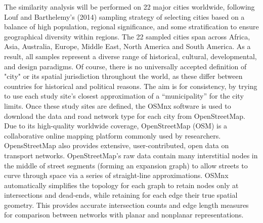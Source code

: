 The similarity analysis will be performed on 22 major cities worldwide, following Louf and Barthelemy's (2014) sampling strategy of selecting cities based on a balance of high population, regional significance, and some stratification to ensure geographical diversity within regions. The 22 sampled cities span across Africa, Asia, Australia, Europe, Middle East, North America and South America. As a result, all samples represent a diverse range of historical, cultural, developmental, and design paradigms. Of course, there is no universally accepted definition of "city" or its spatial jurisdiction throughout the world, as these differ between countries for historical and political reasons. The aim is for consistency, by trying to use each study site’s closest approximation of a “municipality” for the city limits. Once these study sites are defined, the OSMnx software is used to download the data and road network type for each city from OpenStreetMap. Due to its high-quality worldwide coverage, OpenStreetMap (OSM) is a collaborative online mapping platform commonly used by researchers. OpensStreetMap also provides extensive, user-contributed, open data on transport networks. OpenStreetMap’s raw data contain many interstitial nodes in the middle of street segments (forming an expansion graph) to allow streets to curve through space via a series of straight-line approximations. OSMnx automatically simplifies the topology for each graph to retain nodes only at intersections and dead-ends, while retaining for each edge their true spatial geometry. This provides accurate intersection counts and edge length measures for comparison between  networks with planar and nonplanar representations.

